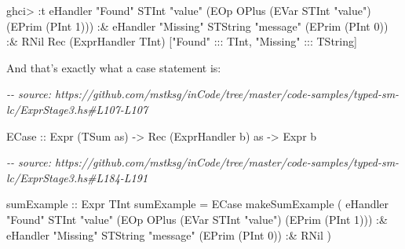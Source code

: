 \documentclass[]{article}
\newenvironment{Shaded}{}{}
\newcommand{\CommentTok}[1]{\textcolor[rgb]{0.38,0.63,0.69}{\textit{#1}}}
\newcommand{\DataTypeTok}[1]{\textcolor[rgb]{0.56,0.13,0.00}{#1}}
\newcommand{\DecValTok}[1]{\textcolor[rgb]{0.25,0.63,0.44}{#1}}
\newcommand{\NormalTok}[1]{#1}
\newcommand{\OperatorTok}[1]{\textcolor[rgb]{0.40,0.40,0.40}{#1}}
\newcommand{\OtherTok}[1]{\textcolor[rgb]{0.00,0.44,0.13}{#1}}
\newcommand{\StringTok}[1]{\textcolor[rgb]{0.25,0.44,0.63}{#1}}
\begin{document}
\begin{Shaded}
\begin{Highlighting}[]
\NormalTok{ghci}\OperatorTok{\textgreater{}} \OperatorTok{:}\NormalTok{t eHandler }\StringTok{"Found"} \DataTypeTok{STInt} \StringTok{"value"}\NormalTok{ (}\DataTypeTok{EOp} \DataTypeTok{OPlus}\NormalTok{ (}\DataTypeTok{EVar} \DataTypeTok{STInt} \StringTok{"value"}\NormalTok{) (}\DataTypeTok{EPrim}\NormalTok{ (}\DataTypeTok{PInt} \DecValTok{1}\NormalTok{)))}
           \OperatorTok{:\&}\NormalTok{ eHandler }\StringTok{"Missing"} \DataTypeTok{STString} \StringTok{"message"}\NormalTok{ (}\DataTypeTok{EPrim}\NormalTok{ (}\DataTypeTok{PInt} \DecValTok{0}\NormalTok{))}
           \OperatorTok{:\&} \DataTypeTok{RNil}
\DataTypeTok{Rec}\NormalTok{ (}\DataTypeTok{ExprHandler} \DataTypeTok{TInt}\NormalTok{) [}\StringTok{"Found"} \OperatorTok{:::} \DataTypeTok{TInt}\NormalTok{, }\StringTok{"Missing"} \OperatorTok{:::} \DataTypeTok{TString}\NormalTok{]}
\end{Highlighting}
\end{Shaded}

And that's exactly what a case statement is:

\begin{Shaded}
\begin{Highlighting}[]
\CommentTok{{-}{-} source: https://github.com/mstksg/inCode/tree/master/code{-}samples/typed{-}sm{-}lc/ExprStage3.hs\#L107{-}L107}

  \DataTypeTok{ECase}\OtherTok{ ::} \DataTypeTok{Expr}\NormalTok{ (}\DataTypeTok{TSum}\NormalTok{ as) }\OtherTok{{-}\textgreater{}} \DataTypeTok{Rec}\NormalTok{ (}\DataTypeTok{ExprHandler}\NormalTok{ b) as }\OtherTok{{-}\textgreater{}} \DataTypeTok{Expr}\NormalTok{ b}
\end{Highlighting}
\end{Shaded}

\begin{Shaded}
\begin{Highlighting}[]
\CommentTok{{-}{-} source: https://github.com/mstksg/inCode/tree/master/code{-}samples/typed{-}sm{-}lc/ExprStage3.hs\#L184{-}L191}

\OtherTok{sumExample ::} \DataTypeTok{Expr} \DataTypeTok{TInt}
\NormalTok{sumExample }\OtherTok{=}
  \DataTypeTok{ECase}
\NormalTok{    makeSumExample}
\NormalTok{    ( eHandler }\StringTok{"Found"} \DataTypeTok{STInt} \StringTok{"value"}\NormalTok{ (}\DataTypeTok{EOp} \DataTypeTok{OPlus}\NormalTok{ (}\DataTypeTok{EVar} \DataTypeTok{STInt} \StringTok{"value"}\NormalTok{) (}\DataTypeTok{EPrim}\NormalTok{ (}\DataTypeTok{PInt} \DecValTok{1}\NormalTok{)))}
        \OperatorTok{:\&}\NormalTok{ eHandler }\StringTok{"Missing"} \DataTypeTok{STString} \StringTok{"message"}\NormalTok{ (}\DataTypeTok{EPrim}\NormalTok{ (}\DataTypeTok{PInt} \DecValTok{0}\NormalTok{))}
        \OperatorTok{:\&} \DataTypeTok{RNil}
\NormalTok{    )}
\end{Highlighting}
\end{Shaded}
\end{document}
